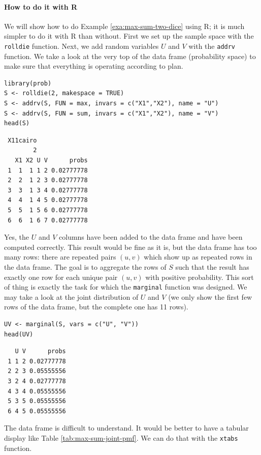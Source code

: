 \documentclass[captions=tableheading]{scrbook}
\begin{document}
\paragraph*{How to do it with \textsf{R}}

We will show how to do Example \ref{exa:max-sum-two-dice} using \textsf{R}; it is much simpler to do it with \textsf{R} than without. First we set up the sample space with the \texttt{rolldie} function. Next, we add random variables \(U\) and \(V\) with the \texttt{addrv} function. We take a look at the very top of the data frame (probability space) to make sure that everything is operating according to plan.




\begin{verbatim}
library(prob)  
S <- rolldie(2, makespace = TRUE)
S <- addrv(S, FUN = max, invars = c("X1","X2"), name = "U")
S <- addrv(S, FUN = sum, invars = c("X1","X2"), name = "V")
head(S)
\end{verbatim}

\begin{verbatim}
 X11cairo 
        2
   X1 X2 U V      probs
 1  1  1 1 2 0.02777778
 2  2  1 2 3 0.02777778
 3  3  1 3 4 0.02777778
 4  4  1 4 5 0.02777778
 5  5  1 5 6 0.02777778
 6  6  1 6 7 0.02777778
\end{verbatim}

Yes, the \(U\) and \(V\) columns have been added to the data frame and have been computed correctly. This result would be fine as it is, but the data frame has too many rows: there are repeated pairs \((u,v)\) which show up as repeated rows in the data frame. The goal is to aggregate the rows of \(S\) such that the result has exactly one row for each unique pair \((u,v)\) with positive probability. This sort of thing is exactly the task for which the \texttt{marginal} function was designed. We may take a look at the joint distribution of \(U\) and \(V\) (we only show the first few rows of the data frame, but the complete one has 11 rows).


\begin{verbatim}
UV <- marginal(S, vars = c("U", "V"))
head(UV)
\end{verbatim}

\begin{verbatim}
   U V      probs
 1 1 2 0.02777778
 2 2 3 0.05555556
 3 2 4 0.02777778
 4 3 4 0.05555556
 5 3 5 0.05555556
 6 4 5 0.05555556
\end{verbatim}

The data frame is difficult to understand. It would be better to have a tabular display like Table \ref{tab:max-sum-joint-pmf}. We can do that with the \texttt{xtabs} function. 
\end{document}

